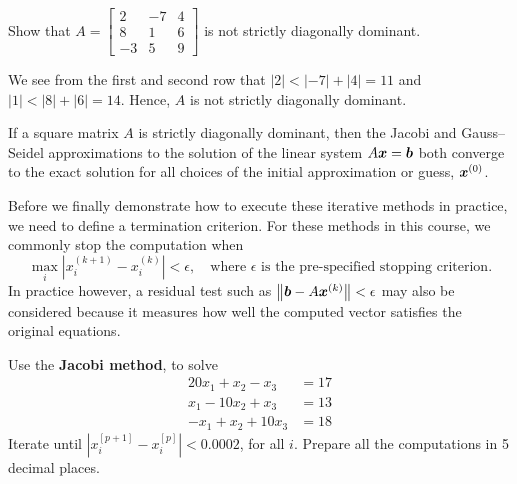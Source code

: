 \begin{example}
Show that
\(
 A=\begin{bmatrix}
 2&-7&4\\
 8&1&6\\
 -3&5&9
 \end{bmatrix}
\)
is not strictly diagonally dominant.
\end{example}

\begin{solution}[2.5cm]
We see from the first and second row that
\(
 |2|<|-7|+|4|=11
\)
and $|1|<|8|+|6|=14$. 
Hence, $A$ is not strictly diagonally dominant.
\end{solution}

\begin{theorem}
If a square matrix $A$ is strictly diagonally dominant, then the Jacobi and Gauss--Seidel approximations to the solution of the linear system $A\boldsymbol{x} = \boldsymbol{b}$ both converge to the exact solution for all choices of the initial approximation or guess, $\boldsymbol{x}^{(0)}$.
\end{theorem}

\noindent
Before we finally demonstrate how to execute these iterative methods in practice, we need to define a termination criterion. For these methods in this course, we commonly stop the computation when
\[
    \max_i|x_i^{(k+1)}-x_i^{(k)}|<\epsilon, 
    \quad \text{where } \epsilon \text{ is the pre-specified stopping criterion}.
\]
In practice however, a residual test such as $\left\lVert \boldsymbol{b}-A\boldsymbol{x}^{(k)}\right\rVert<\epsilon$ may also be considered because it measures how well the computed vector satisfies the original equations.

\begin{example}
Use the \textbf{Jacobi method}, to solve
\[
\begin{aligned}
20x_1+x_2-x_3&=17\\
x_1-10x_2+x_3&=13\\
-x_1+x_2+10x_3&=18
\end{aligned}
\]
Iterate until $|x_i^{[p+1]}-x_i^{[p]}| < 0.0002$, for all $i$. Prepare all the computations in 5 decimal places.
\end{example}

